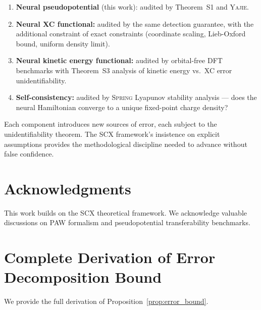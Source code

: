 \documentclass[11pt,a4paper]{article}
\theoremstyle{definition}
\newcommand{\Yajie}{\textsc{Yajie}}
\newcommand{\Spring}{\textsc{Spring}}
\newcommand{\SCX}{\textsc{SCX}}
\newcommand{\ThmSCXNoise}{Theorem~S1}
\newcommand{\ThmSCXHonest}{Theorem~S3}
\begin{document}
\begin{enumerate}[label=(\roman*)]
    \item \textbf{Neural pseudopotential} (this work): audited by \ThmSCXNoise{} and \Yajie{}.
    \item \textbf{Neural XC functional:} audited by the same detection guarantee, with the additional constraint of exact constraints (coordinate scaling, Lieb-Oxford bound, uniform density limit).
    \item \textbf{Neural kinetic energy functional:} audited by orbital-free DFT benchmarks with \ThmSCXHonest{} analysis of kinetic energy vs.\ XC error unidentifiability.
    \item \textbf{Self-consistency:} audited by \Spring{} Lyapunov stability analysis — does the neural Hamiltonian converge to a unique fixed-point charge density?
\end{enumerate}

Each component introduces new sources of error, each subject to the unidentifiability theorem. The \SCX{} framework's insistence on explicit assumptions provides the methodological discipline needed to advance without false confidence.

\section*{Acknowledgments}

This work builds on the \SCX{} theoretical framework. We acknowledge valuable discussions on PAW formalism and pseudopotential transferability benchmarks.

\appendix
\section{Complete Derivation of Error Decomposition Bound}
\label{sec:app_error}

We provide the full derivation of Proposition~\ref{prop:error_bound}.
\end{document}
